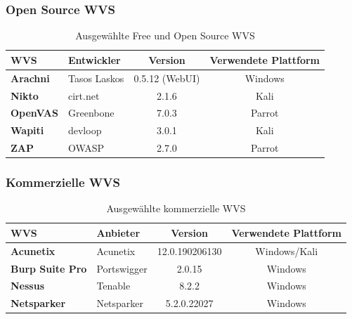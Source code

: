 \documentclass[12pt,oneside,a4paper,parskip,pointlessnumbers]{scrbook}
\begin{document}
    \subsubsection{Open Source WVS}
      \begin{table}[H]
        \centering
          \begin{tabular}{|l|l|c|c|}
            \hline
            \textbf{WVS}              & \textbf{Entwickler}  & \textbf{Version}     & \textbf{Verwendete Plattform}  \\
            \hline
            \textbf{Arachni}          & Tasos Laskos         & 0.5.12 (WebUI)       & Windows                       \\
            \hline
            \textbf{Nikto}            & cirt.net             & 2.1.6                & Kali                          \\
            \hline
            \textbf{OpenVAS}          & Greenbone            & 7.0.3                & Parrot                        \\
            \hline
            \textbf{Wapiti}           & devloop              & 3.0.1                & Kali                          \\
            \hline
            \textbf{ZAP}              & OWASP                & 2.7.0                & Parrot                        \\
            \hline
          \end{tabular}
        \caption[Ausgewählte Free und Open Source WVS]{Ausgewählte Free und Open Source WVS}
      \end{table}

    \subsubsection{Kommerzielle WVS}
      \begin{table}[H]
        \centering
          \begin{tabular}{|p{4cm}|l|c|c|}
            \hline
            \textbf{WVS}            & \textbf{Anbieter} & \textbf{Version} & \textbf{Verwendete Plattform}  \\
            \hline
            \textbf{Acunetix}       & Acunetix          & 12.0.190206130   & Windows/Kali                          \\
            \hline
            \textbf{Burp Suite Pro} & Portswigger       & 2.0.15           & Windows                       \\
            \hline
            \textbf{Nessus}         & Tenable           & 8.2.2            & Windows                       \\
            \hline
            \textbf{Netsparker}     & Netsparker        & 5.2.0.22027      & Windows                       \\
            \hline
          \end{tabular}
        \caption[Ausgewählte kommerzielle WVS]{Ausgewählte kommerzielle WVS}
      \end{table}
\end{document}
